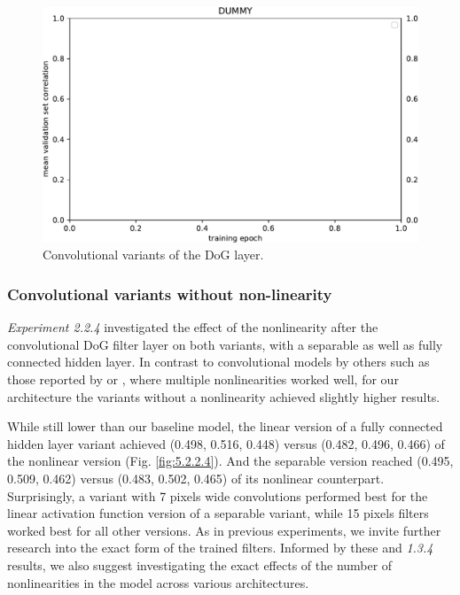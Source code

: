 \begin{figure}[H]
    \centering
    \includegraphics[width=1\textwidth]{../figures/05_dummy}
    \caption[Experiment 5.2.2.3]{Convolutional variants of the DoG layer.}
    \label{fig:5.2.2.3}
\end{figure}

\subsubsection{Convolutional variants without non-linearity}

\textit{Experiment 2.2.4} investigated the effect of the nonlinearity after the convolutional DoG filter layer on both variants, with a separable as well as fully connected hidden layer. In contrast to convolutional models by others such as those reported by \cite{klidnt} or \cite{ecker}, where multiple nonlinearities worked well, for our architecture the variants without a nonlinearity achieved slightly higher results.

While still lower than our baseline model, the linear version of a fully connected hidden layer variant achieved (0.498, 0.516, 0.448) versus (0.482, 0.496, 0.466) of the nonlinear version (Fig. \ref{fig:5.2.2.4}). And the separable version reached (0.495, 0.509, 0.462) versus (0.483, 0.502, 0.465) of its nonlinear counterpart. Surprisingly, a variant with 7 pixels wide convolutions performed best for the linear activation function version of a separable variant, while 15 pixels filters worked best for all other versions. As in previous experiments, we invite further research into the exact form of the trained filters. Informed by these and \textit{1.3.4} results, we also suggest investigating the exact effects of the number of nonlinearities in the model across various architectures.


